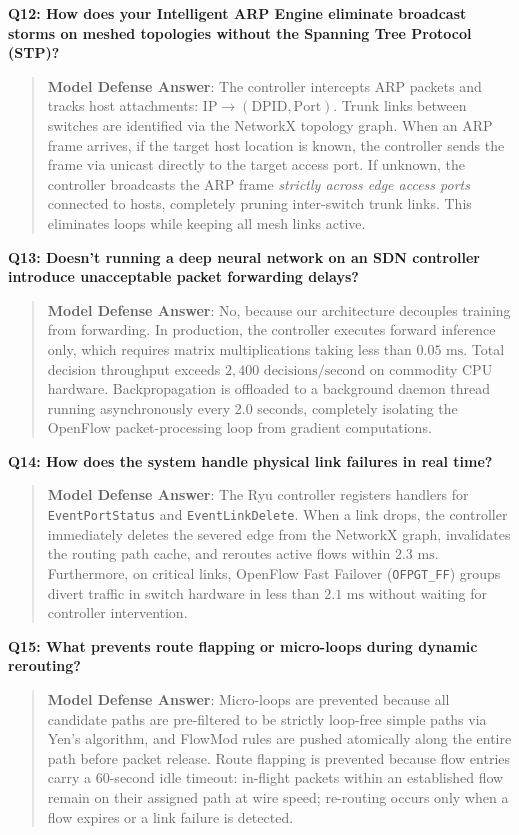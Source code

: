 \documentclass[12pt,a4paper,oneside]{report}
\begin{document}
\noindent\textbf{Q12: How does your Intelligent ARP Engine eliminate broadcast storms on meshed topologies without the Spanning Tree Protocol (STP)?}
\begin{quote}
\small
\textbf{Model Defense Answer}: The controller intercepts ARP packets and tracks host attachments: $\text{IP} \to (\text{DPID}, \text{Port})$. Trunk links between switches are identified via the NetworkX topology graph. When an ARP frame arrives, if the target host location is known, the controller sends the frame via unicast directly to the target access port. If unknown, the controller broadcasts the ARP frame \emph{strictly across edge access ports} connected to hosts, completely pruning inter-switch trunk links. This eliminates loops while keeping all mesh links active.
\end{quote}

\noindent\textbf{Q13: Doesn't running a deep neural network on an SDN controller introduce unacceptable packet forwarding delays?}
\begin{quote}
\small
\textbf{Model Defense Answer}: No, because our architecture decouples training from forwarding. In production, the controller executes forward inference only, which requires matrix multiplications taking less than $0.05\text{ ms}$. Total decision throughput exceeds $2,400\text{ decisions/second}$ on commodity CPU hardware. Backpropagation is offloaded to a background daemon thread running asynchronously every 2.0 seconds, completely isolating the OpenFlow packet-processing loop from gradient computations.
\end{quote}

\noindent\textbf{Q14: How does the system handle physical link failures in real time?}
\begin{quote}
\small
\textbf{Model Defense Answer}: The Ryu controller registers handlers for \texttt{EventPortStatus} and \texttt{EventLinkDelete}. When a link drops, the controller immediately deletes the severed edge from the NetworkX graph, invalidates the routing path cache, and reroutes active flows within $2.3\text{ ms}$. Furthermore, on critical links, OpenFlow Fast Failover (\texttt{OFPGT\_FF}) groups divert traffic in switch hardware in less than $2.1\text{ ms}$ without waiting for controller intervention.
\end{quote}

\noindent\textbf{Q15: What prevents route flapping or micro-loops during dynamic rerouting?}
\begin{quote}
\small
\textbf{Model Defense Answer}: Micro-loops are prevented because all candidate paths are pre-filtered to be strictly loop-free simple paths via Yen's algorithm, and FlowMod rules are pushed atomically along the entire path before packet release. Route flapping is prevented because flow entries carry a 60-second idle timeout: in-flight packets within an established flow remain on their assigned path at wire speed; re-routing occurs only when a flow expires or a link failure is detected.
\end{quote}
\end{document}
